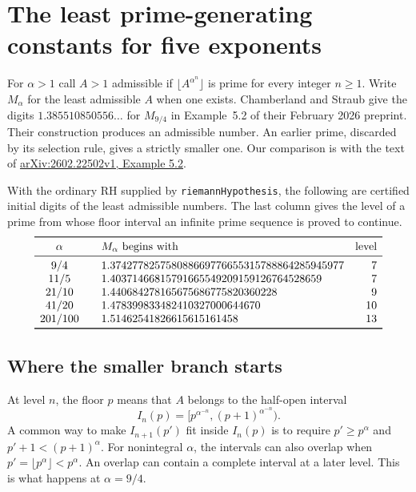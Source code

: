 \section{The least prime-generating constants for five exponents}
\label{sec:mills}
For $\alpha>1$ call $A>1$ admissible if $\lfloor A^{\alpha^n}\rfloor$ is prime for every integer $n\ge1$. Write $M_\alpha$ for the least admissible $A$ when one exists. Chamberland and Straub give the digits $1.385510850556\ldots$ for $M_{9/4}$ in Example~5.2 of their February 2026 preprint. Their construction produces an admissible number. An earlier prime, discarded by its selection rule, gives a strictly smaller one. Our comparison is with the text of \href{https://arxiv.org/html/2602.22502v1}{arXiv:2602.22502v1, Example 5.2}.

\begin{theorem}\label{thm:mills}
With the ordinary RH supplied by \texttt{riemannHypothesis}, the following are certified initial digits of the least admissible numbers. The last column gives the level of a prime from whose floor interval an infinite prime sequence is proved to continue.
\[
\begin{array}{c@{\qquad}l@{\quad}r}
\toprule
\alpha & M_\alpha \text{ begins with} & \text{level}\\
\midrule
9/4 &1.374277825758088669776655315788864285945977 &7\\
11/5 &1.40371466815791665549209159126764528659 &7\\
21/10 &1.440684278165675686775820360228 &9\\
41/20 &1.478399833482410327000644670 &10\\
201/100 &1.51462541826615615161458 &13\\
\bottomrule
\end{array}
\]
\end{theorem}

\subsection{Where the smaller branch starts}
At level $n$, the floor $p$ means that $A$ belongs to the half-open interval
\[
 I_n(p)=[p^{\alpha^{-n}},(p+1)^{\alpha^{-n}}).
\]
A common way to make $I_{n+1}(p')$ fit inside $I_n(p)$ is to require $p'\ge p^\alpha$ and $p'+1<(p+1)^\alpha$. For nonintegral $\alpha$, the intervals can also overlap when $p'=\lfloor p^\alpha\rfloor<p^\alpha$. An overlap can contain a complete interval at a later level. This is what happens at $\alpha=9/4$.

